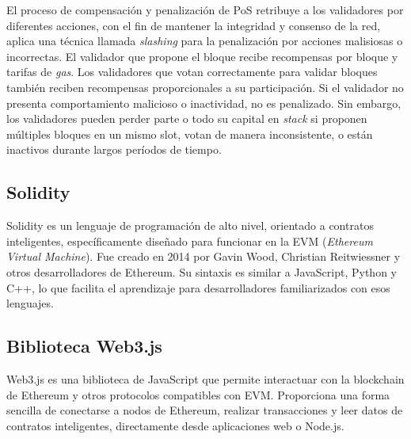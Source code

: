 El proceso de compensación y penalización de PoS retribuye a los validadores por diferentes acciones, con el fin de mantener la integridad y consenso de la red, aplica una técnica llamada \textit{slashing} para la penalización por acciones malisiosas o incorrectas. El validador que propone el bloque recibe recompensas por bloque y tarifas de \textit{gas}. Los validadores que votan correctamente para validar bloques también reciben recompensas proporcionales a su participación. Si el validador no presenta comportamiento malicioso o inactividad, no es penalizado. Sin embargo, los validadores pueden perder parte o todo su capital en \textit{stack} si proponen múltiples bloques en un mismo slot, votan de manera inconsistente, o están inactivos durante largos períodos de tiempo.






\subsection{Solidity}

Solidity \cite{solidity} es un lenguaje de programación de alto nivel, orientado a contratos inteligentes, específicamente diseñado para funcionar en la EVM (\textit{Ethereum Virtual Machine}). Fue creado en 2014 por Gavin Wood, Christian Reitwiessner y otros desarrolladores de Ethereum. Su sintaxis es similar a JavaScript, Python y C++, lo que facilita el aprendizaje para desarrolladores familiarizados con esos lenguajes. 


\subsection{Biblioteca Web3.js}

Web3.js \citep{web3} es una biblioteca de JavaScript que permite interactuar con la blockchain de Ethereum y otros protocolos compatibles con EVM. Proporciona una forma sencilla de conectarse a nodos de Ethereum, realizar transacciones y leer datos de contratos inteligentes, directamente desde aplicaciones web o Node.js.



